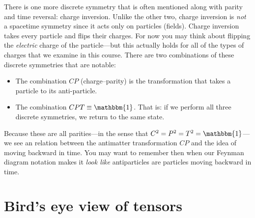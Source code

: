 \documentclass[12pt, oneside]{report}    %
\let\oldsection\section
\def\section{%
  \setcounter{sidenote}{1}%
  \oldsection
}
\begin{document}
\begin{subappendices}
There is one more discrete symmetry that is often mentioned along with parity and time reversal: charge inversion. Unlike the other two, charge inversion is \emph{not} a spacetime symmetry since it acts only on particles (fields). Charge inversion takes every particle and flips their charges. For now you may think about flipping the \emph{electric} charge of the particle---but this actually holds for all of the types of charges that we examine in this course. There are two combinations of these discrete symmetries that are notable:
\begin{itemize}
    \item The combination $CP$ (charge--parity) is the transformation that takes a particle to its anti-particle.
    \item The combination $CPT \equiv \mathbbm{1}$. That is: if we perform all three discrete symmetries, we return to the same state.
\end{itemize}
Because these are all parities---in the sense that $C^2 = P^2 = T^2 = \mathbbm{1}$---we see an relation between the antimatter transformation $CP$ and the idea of moving backward in time. You may want to remember then when our Feynman diagram notation makes it \emph{look like} antiparticles are particles moving backward in time.


\section{Bird's eye view of tensors}


\end{subappendices}
\end{document}
